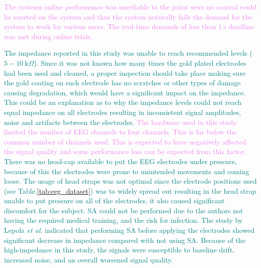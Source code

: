 \textcolor{violet}{The systems online performance was unreliable to the point were no control could be exerted on the system and thus the system naturally fails the demand for the system to work for various users.}
\textcolor{violet}{The real-time demands of less than $1\:\text{s}$ deadline was met during online trials.}


\textcolor{teal}{The impedance reported in this study was unable to reach recommended levels ($ 5-10\: \text{k}\Omega$)\:\cite{goreckaDependenceElectrodeImpedance2019}. Since it was not known how many times the gold plated electrodes had been used and cleaned, a proper inspection should take place making sure the gold coating on each electrode has no scratches or other types of damage causing degradation, which would have a significant impact on the impedance\:\cite{goreckaDependenceElectrodeImpedance2019}.}
\textcolor{teal}{This could be an explanation as to why the impedance levels could not reach equal impedance on all electrodes resulting in inconsistent signal amplitudes, noise and artifacts between the electrodes.}
\textcolor{violet}{The hardware used in this study limited the number of EEG channels to four channels. This is far below the common number of channels used\:\textcolor{teal}{\cite{zhouSignalPredictionbasedMethod2023}\cite{blankertzBCICompetitionIII2006}}. This is expected to have negatively affected the signal quality and some performance loss can be expected from this factor.}
\textcolor{teal}{There was no head-cap available to put the EEG electrodes under pressure, because of this the electrodes were prone to unintended movements and coming loose. The usage of head straps was not optimal since the electrode positions used (see Table.\:\ref{tab:eeg_dataset}) was to widely spread out resulting in the head strap unable to put pressure on all of the electrodes, it also caused significant discomfort for the subject.}
\textcolor{teal}{SA could not be performed due to the authors not having the required medical training, and the risk for infection. The study by Lepola \textit{et al.} indicated that performing SA before applying the electrodes showed significant decrease in impedance compared with not using SA\:\cite{lepolaScreenprintedEEGElectrode2014}.}
\textcolor{teal}{Because of the high-impedance in this study, the signals were susceptible to baseline drift, increased noise, and an overall worsened signal quality.}

